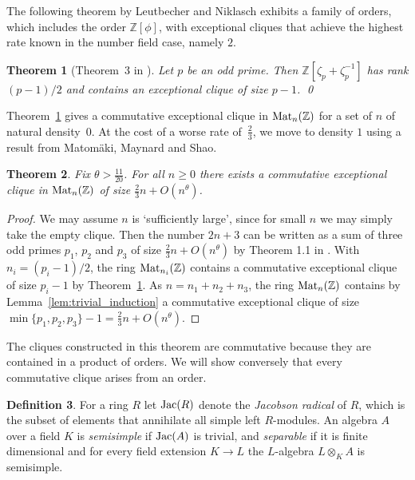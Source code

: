 \documentclass{amsart}
\theoremstyle{plain}
\newtheorem{theorem}{Theorem}[section]
\theoremstyle{definition}
\newtheorem{definition}[theorem]{Definition}
\newcommand{\tensor}{\otimes}
\newcommand{\Z}{\ensuremath{\mathbb{Z}}}
\newcommand{\nrg}{R}
\begin{document}
The following theorem by Leutbecher and Niklasch exhibits a family of orders, which includes the order \(\Z[\phi]\), with exceptional cliques that achieve the highest rate known in the number field case, namely \(2\).

\begin{theorem}[Theorem~3 in \cite{Leutbecher}]\label{thm:nt_solution}
	Let \(p\) be an odd prime. Then \(\Z[\zeta_p+\zeta_p^{-1}]\) has rank \((p-1)/2\) and contains an exceptional clique of size \(p-1\). \qed
\end{theorem}

Theorem~\ref{thm:nt_solution} gives a commutative exceptional clique in \(\textup{Mat}_n(\Z)\) for a set of \(n\) of natural density~\(0\). At the cost of a worse rate of~\(\frac{2}{3}\), we move to density \(1\) using a result from Matom\"aki, Maynard and Shao.

\begin{theorem}\label{thm:goldbach}
	Fix \(\theta > \frac{11}{20}\). For all \(n\geq 0\) there exists a commutative exceptional clique in \(\textup{Mat}_n(\Z)\) of size \(\frac{2}{3}n + O(n^{\theta})\).
\end{theorem}
\begin{proof}
	We may assume \(n\) is `sufficiently large', since for small \(n\) we may simply take the empty clique. 
	Then the number \(2n+3\) can be written as a sum of three odd primes \(p_1\), \(p_2\) and \(p_3\) of size \(\frac{2}{3}n+O(n^\theta)\) by Theorem 1.1 in \cite{Vinogradov}.
	With \(n_i=(p_i-1)/2\), the ring \(\textup{Mat}_{n_i}(\Z)\) contains a commutative exceptional clique of size \(p_i-1\) by Theorem~\ref{thm:nt_solution}.
	As \(n=n_1+n_2+n_3\), the ring \(\textup{Mat}_{n}(\Z)\) contains by Lemma~\ref{lem:trivial_induction} a commutative exceptional clique of size \(\min\{p_1,p_2,p_3\}-1=\frac{2}{3}n+O(n^\theta)\).
\end{proof}

The cliques constructed in this theorem are commutative because they are contained in a product of orders.
We will show conversely that every commutative clique arises from an order. 

\begin{definition}
	For a ring \(\nrg\) let \(\textup{Jac}(\nrg)\) denote the \emph{Jacobson radical} of \(\nrg\), which is the subset of elements that annihilate all simple left \(\nrg\)-modules.
	An algebra \(A\) over a field \(K\) is \emph{semisimple} if \(\textup{Jac}(A)\) is trivial, and \emph{separable} if it is finite dimensional and for every field extension \(K\to L\) the \(L\)-algebra \(L\tensor_K A\) is semisimple.
\end{definition}
\end{document}
